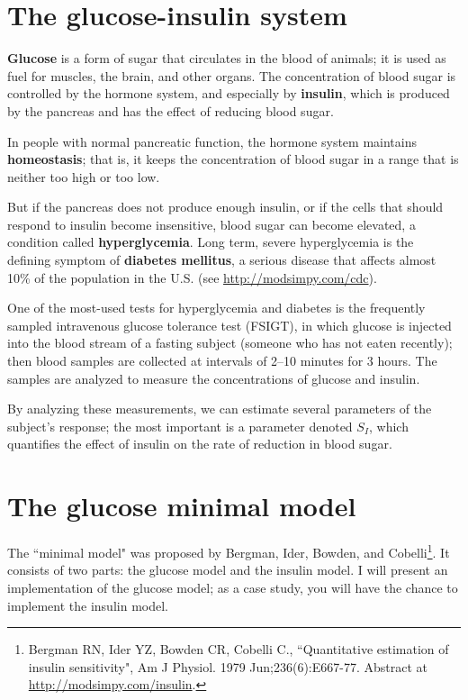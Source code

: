 \documentclass[12pt]{book}
\theoremstyle{exercise}
\begin{document}
\section{The glucose-insulin system}

{\bf Glucose} is a form of sugar that circulates in the blood of animals; it is used as fuel for muscles, the brain, and other organs.  The concentration of blood sugar is controlled by the hormone system, and especially by {\bf insulin}, which is produced by the pancreas and has the effect of reducing blood sugar.


In people with normal pancreatic function, the hormone system maintains {\bf homeostasis}; that is, it keeps the concentration of blood sugar in a range that is neither too high or too low.

But if the pancreas does not produce enough insulin, or if the cells that should respond to insulin become insensitive, blood sugar can become elevated, a condition called {\bf hyperglycemia}.  Long term, severe hyperglycemia is the defining symptom of {\bf diabetes mellitus}, a serious disease that affects almost 10\% of the population in the U.S. (see \url{http://modsimpy.com/cdc}).


One of the most-used tests for hyperglycemia and diabetes is the frequently sampled intravenous glucose tolerance test (FSIGT), in which glucose is injected into the blood stream of a fasting subject (someone who has not eaten recently); then blood samples are collected at intervals of 2--10 minutes for 3 hours.  The samples are analyzed to measure the concentrations of glucose and insulin.


By analyzing these measurements, we can estimate several parameters of the subject's response; the most important is a parameter denoted $S_I$, which quantifies the effect of insulin on the rate of reduction in blood sugar.


\section{The glucose minimal model}

The ``minimal model" was proposed by Bergman, Ider, Bowden, and Cobelli\footnote{Bergman RN, Ider YZ, Bowden CR, Cobelli C., ``Quantitative estimation of insulin sensitivity", Am J Physiol. 1979 Jun;236(6):E667-77.  Abstract at \url{http://modsimpy.com/insulin}.}.
It consists of two parts: the glucose model and the insulin model.  I will present an implementation of the glucose model; as a case study, you will have the chance to implement the insulin model.
\end{document}
